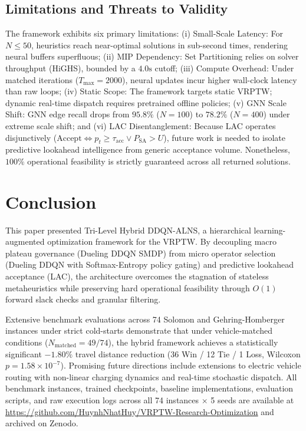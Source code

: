 \documentclass{ieeeaccess}
\begin{document}
\subsection{Limitations and Threats to Validity}
\label{sec:disc_limitations}
The framework exhibits six primary limitations: (i) Small-Scale Latency: For $N \le 50$, heuristics reach near-optimal solutions in sub-second times, rendering neural buffers superfluous; (ii) MIP Dependency: Set Partitioning relies on solver throughput (HiGHS), bounded by a $4.0\text{s}$ cutoff; (iii) Compute Overhead: Under matched iterations ($T_{\max}=2000$), neural updates incur higher wall-clock latency than raw loops; (iv) Static Scope: The framework targets static VRPTW; dynamic real-time dispatch requires pretrained offline policies; (v) GNN Scale Shift: GNN edge recall drops from $95.8\%$ ($N=100$) to $78.2\%$ ($N=400$) under extreme scale shift; and (vi) LAC Disentanglement: Because LAC operates disjunctively ($\text{Accept} \iff p_t \ge \tau_{\text{acc}} \lor P_{\text{SA}} > U$), future work is needed to isolate predictive lookahead intelligence from generic acceptance volume. Nonetheless, $100\%$ operational feasibility is strictly guaranteed across all returned solutions.

\section{Conclusion}
\label{sec:conclusion}
This paper presented Tri-Level Hybrid DDQN-ALNS, a hierarchical learning-augmented optimization framework for the VRPTW. By decoupling macro plateau governance (Dueling DDQN SMDP) from micro operator selection (Dueling DDQN with Softmax-Entropy policy gating) and predictive lookahead acceptance (LAC), the architecture overcomes the stagnation of stateless metaheuristics while preserving hard operational feasibility through $O(1)$ forward slack checks and granular filtering. 

Extensive benchmark evaluations across 74 Solomon and Gehring-Homberger instances under strict cold-starts demonstrate that under vehicle-matched conditions ($N_{\text{matched}}=49/74$), the hybrid framework achieves a statistically significant $-1.80\%$ travel distance reduction (36 Win / 12 Tie / 1 Loss, Wilcoxon $p=1.58 \times 10^{-7}$). Promising future directions include extensions to electric vehicle routing with non-linear charging dynamics and real-time stochastic dispatch. All benchmark instances, trained checkpoints, baseline implementations, evaluation scripts, and raw execution logs across all 74 instances $\times$ 5 seeds are available at \url{https://github.com/HuynhNhatHuy/VRPTW-Research-Optimization} and archived on Zenodo.
\end{document}
